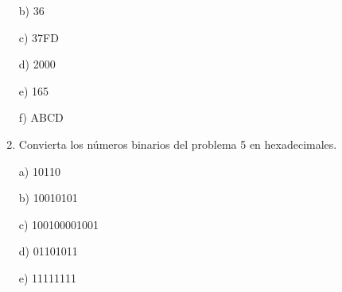 \documentclass[a4paper, 12pt]{article}
\newcommand{\Aspace}{0.2cm}
\begin{document}
\begin{enumerate}
            \vspace{\Aspace} \par
            b) 36
            \\ { \color{azul}  }

            \vspace{\Aspace} \par
            c) 37FD
            \\ { \color{azul}  }

            \vspace{\Aspace} \par
            d) 2000
            \\ { \color{azul}  }

            \vspace{\Aspace} \par
            e) 165
            \\ { \color{azul}  }

            \vspace{\Aspace} \par
            f) ABCD
            \\ { \color{azul}  }


        \item Convierta los números binarios del problema 5 en hexadecimales.
            \vspace{\Aspace} \par
            a) 10110
            \\ { \color{azul}  }

            \vspace{\Aspace} \par
            b) 10010101
            \\ { \color{azul}  }

            \vspace{\Aspace} \par
            c) 100100001001
            \\ { \color{azul}  }

            \vspace{\Aspace} \par
            d) 01101011
            \\ { \color{azul}  }

            \vspace{\Aspace} \par
            e) 11111111
            \\ { \color{azul}  }


\end{enumerate}
\end{document}
